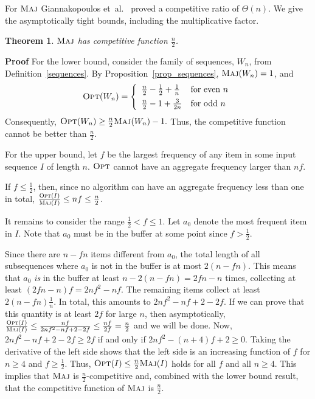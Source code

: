 \documentclass[11pt]{article}
\newtheorem{xtheorem}{Theorem}
\newenvironment{theorem}{\begin{xtheorem}\rm}{\end{xtheorem}}
\newenvironment{proof}{\begin{trivlist}\item[]{\bf Proof }}{\hspace*{\fill}\raisebox{-1pt}{\boldmath$\Box$}\end{trivlist}}
\newcommand{\opt}{{\ensuremath{\textsc{Opt}}}\xspace}
\newcommand{\maj}{{\ensuremath{\textsc{Maj}}}\xspace}
\begin{document}
For \maj Giannakopoulos et~al.~\cite{Giannakopoulos12} proved a competitive ratio of $\varTheta(n)$.
We give the asymptotically tight bounds, including the multiplicative factor.
\begin{theorem}\label{thm:comp_maj}
\maj has competitive function $\frac{n}{2}$.
\end{theorem}
\begin{proof}
For the lower bound, consider the family of sequences, $W_n$, from
Definition~\ref{sequences}.
By Proposition~\ref{prop_sequences}, $\maj(W_n) = 1$,
and
$$\opt(W_n) = \left\{ \begin{array}{ll}
\frac{n}{2} - \frac{1}{2} + \frac{1}{n} & \mbox{for even $n$}\\[1ex]
\frac{n}{2} -1 + \frac{3}{2n}  & \mbox{for odd $n$}
\end{array} \right.$$
Consequently,
$ \opt(W_n) \geq \frac{n}{2}\maj(W_n) - 1.$
Thus, the competitive function cannot be better than $\frac{n}{2}$.

For the upper bound, let $f$ be the largest frequency of any item
in some input sequence $I$ of length $n$.
\opt cannot have an aggregate frequency larger than $nf$.

If $f \leq \frac{1}{2}$, then, since no algorithm can have an
aggregate frequency
less than one in total, $\frac{\opt(I)}{\maj(I)}\leq nf\leq \frac{n}{2}$.

It remains to consider the range $\frac{1}{2} < f \leq 1$.
Let $a_0$ denote the most frequent item in $I$.
Note that $a_0$ must be in the buffer at some point since $f>\frac{1}{2}$.


Since there are $n-fn$ items different from $a_0$, the total
length of all subsequences where $a_0$ is not in the buffer
is at most $2(n-fn)$.
This means that $a_0$ {\em is} in the buffer at least
$n - 2(n-fn) = 2fn - n$ times, collecting
at least $(2fn - n)f=2nf^2-nf$. The remaining items
collect at least $2(n-fn)\frac{1}{n}$. In total, this
amounts to $2nf^2-nf+2-2f$.
If we can prove that this quantity is at least $2f$ for large
$n$,
then asymptotically,
$\frac{\opt(I)}{\maj(I)}\leq \frac{nf}{2nf^2-nf+2-2f}
 \leq\frac{nf}{2f}=\frac{n}{2}$
and we will be done.
Now,
$ 2nf^2-nf+2-2f \geq 2f $ if and only if
$ 2nf^2-(n+4)f+2\geq 0 $. Taking the derivative of the left
side shows that the left side is an increasing function of $f$
for $n\geq 4$ and $f\geq \frac{1}{2}$. Thus, $\opt(I) \leq \frac{n}{2}\maj(I)$ holds
for all $f$ and all $n\geq 4$. This implies that \maj is $\frac{n}{2}$-competitive and, combined with the lower bound result, that the competitive function of \maj is $\frac{n}{2}$.
\end{proof}
\end{document}
